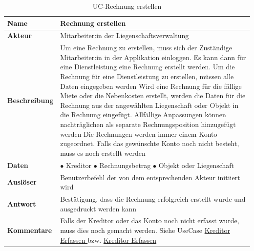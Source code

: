 \begin{table}[H]
  \centering
  \settowidth{}
  \setlength\extrarowheight{2pt}
  \begin{tabulary}{1.0\textwidth}{|a|m{14cm}|}
    \hline
    \textbf{Name}& Rechnung erstellen\\
    \hline
    \textbf{Akteur}& Mitarbeiter:in der Liegenschaftsverwaltung\\
    \hline 
    \textbf{Beschreibung} & Um eine Rechnung zu erstellen, muss sich der Zuständige Mitarbeiter:in in der Applikation einloggen. Es kann dann für eine Dienstleistung eine Rechnung erstellt werden. Um die Rechnung für eine Dienstleistung zu erstellen, müssen alle Daten eingegeben werden \newline 
    Wird eine Rechnung für die fällige Miete oder die Nebenkosten erstellt, werden die Daten für die Rechnung aus der angewählten Liegenschaft oder Objekt in die Rechnung eingefügt. Allfällige Anpassungen können nachträglichen als separate Rechnungsposition hinzugefügt werden \newline
    Die Rechnungen werden immer einem Konto zugeordnet. Falls das gewünschte Konto noch nicht besteht, muss es noch erstellt werden\\
    \hline
    \textbf{Daten} &       
      $\bullet$ Kreditor\newline
      $\bullet$ Rechnungsbetrag \newline
      $\bullet$ Objekt oder Liegenschaft\\
    \hline
    \textbf{Auslöser} & Benutzerbefehl der von dem entsprechenden Akteur initiiert wird\\
    \hline
    \textbf{Antwort} & Bestätigung, dass die Rechnung erfolgreich erstellt wurde und ausgedruckt werden kann\\
    \hline
    \textbf{Kommentare} & Falls der Kreditor oder das Konto noch nicht erfasst wurde, muss dies noch gemacht werden. Siehe UseCase \hyperref[kreditorErfassen]{Kreditor Erfassen } bzw. \hyperref[kreditorErfassen]{Kreditor Erfassen }\\
    \hline
  \end{tabulary}
  \caption{UC-Rechnung erstellen}
\end{table}

